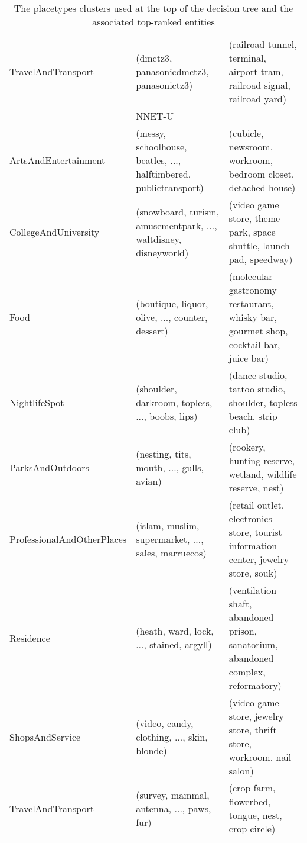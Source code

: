 \begin{landscape}
\begin{table}[]
\begin{tabular}{lll}
TravelAndTransport         & (dmctz3, panasonicdmctz3, panasonictz3)                                                   & (railroad tunnel, terminal, airport tram, railroad signal, railroad yard)                           \\
& NNET-U                                                                                    &                                                                                                     \\
ArtsAndEntertainment       & (messy, schoolhouse, beatles, ..., halftimbered, publictransport)                         & (cubicle, newsroom, workroom, bedroom closet, detached house)                                       \\
CollegeAndUniversity       & (snowboard, turism, amusementpark, ..., waltdisney, disneyworld)                          & (video game store, theme park, space shuttle, launch pad, speedway)                                 \\
Food                       & (boutique, liquor, olive, ..., counter, dessert)                                          & (molecular gastronomy restaurant, whisky bar, gourmet shop, cocktail bar, juice bar)                \\
NightlifeSpot              & (shoulder, darkroom, topless, ..., boobs, lips)                                           & (dance studio, tattoo studio, shoulder, topless beach, strip club)                                  \\
ParksAndOutdoors           & (nesting, tits, mouth, ..., gulls, avian)                                                 & (rookery, hunting reserve, wetland, wildlife reserve, nest)                                         \\
ProfessionalAndOtherPlaces & (islam, muslim, supermarket, ..., sales, marruecos)                                       & (retail outlet, electronics store, tourist information center, jewelry store, souk)                 \\
Residence                  & (heath, ward, lock, ..., stained, argyll)                                                 & (ventilation shaft, abandoned prison, sanatorium, abandoned complex, reformatory)                   \\
ShopsAndService            & (video, candy, clothing, ..., skin, blonde)                                               & (video game store, jewelry store, thrift store, workroom, nail salon)                               \\
TravelAndTransport         & (survey, mammal, antenna, ..., paws, fur)                                                 & (crop farm, flowerbed, tongue, nest, crop circle)                                                  
                                              
	\end{tabular}\caption{The placetypes clusters used at the top of the decision tree and the associated top-ranked entities}\label{ch5:placeent}
\end{table}
\end{landscape}


